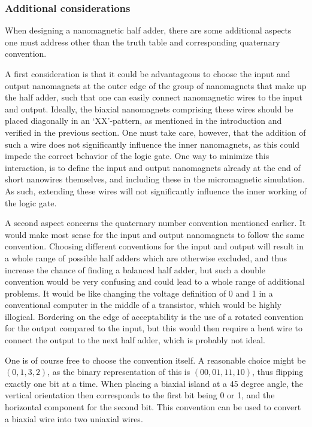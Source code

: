 \documentclass[11pt,a4paper,english]{article}
\begin{document}
\subsubsection{Additional considerations}
When designing a nanomagnetic half adder, there are some additional aspects one must address other than the truth table and corresponding quaternary convention. \par
A first consideration is that it could be advantageous to choose the input and output nanomagnets at the outer edge of the group of nanomagnets that make up the half adder, such that one can easily connect nanomagnetic wires to the input and output. Ideally, the biaxial nanomagnets comprising these wires should be placed diagonally in an `XX'-pattern, as mentioned in the introduction and verified in the previous section. One must take care, however, that the addition of such a wire does not significantly influence the inner nanomagnets, as this could impede the correct behavior of the logic gate. One way to minimize this interaction, is to define the input and output nanomagnets already at the end of short nanowires themselves, and including these in the micromagnetic simulation. As such, extending these wires will not significantly influence the inner working of the logic gate. \par
A second aspect concerns the quaternary number convention mentioned earlier. It would make most sense for the input and output nanomagnets to follow the same convention. Choosing different conventions for the input and output will result in a whole range of possible half adders which are otherwise excluded, and thus increase the chance of finding a balanced half adder, but such a double convention would be very confusing and could lead to a whole range of additional problems. It would be like changing the voltage definition of 0 and 1 in a conventional computer in the middle of a transistor, which would be highly illogical. Bordering on the edge of acceptability is the use of a rotated convention for the output compared to the input, but this would then require a bent wire to connect the output to the next half adder, which is probably not ideal. \par
One is of course free to choose the convention itself. A reasonable choice might be $(0,1,3,2)$, as the binary representation of this is $(00, 01, 11, 10)$, thus flipping exactly one bit at a time. When placing a biaxial island at a 45 degree angle, the vertical orientation then corresponds to the first bit being 0 or 1, and the horizontal component for the second bit. This convention can be used to convert a biaxial wire into two uniaxial wires.
\end{document}
